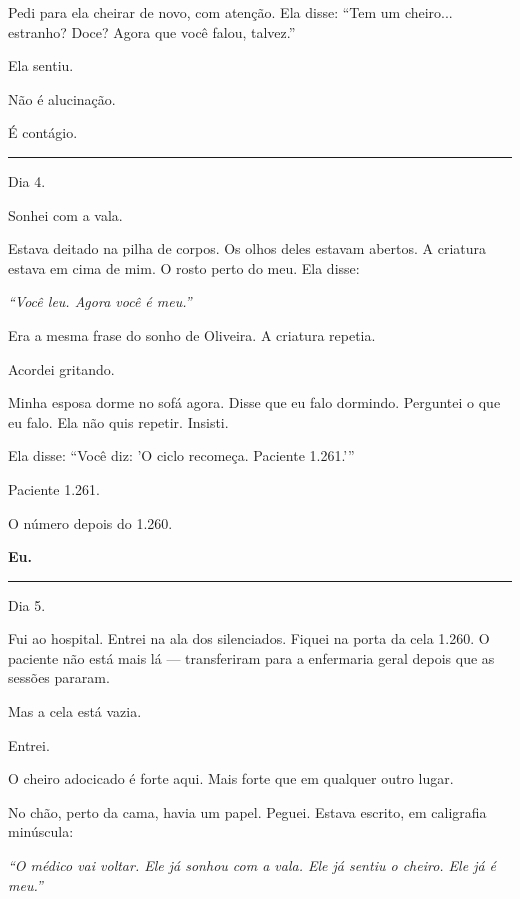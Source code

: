 \noindent Pedi para ela cheirar de novo, com atenção. Ela disse: \textquotedblleft{}Tem um cheiro... estranho? Doce? Agora que você falou, talvez.\textquotedblright{}

\noindent Ela sentiu.

\noindent Não é alucinação.

\noindent É contágio.

\vspace{0.5em}\noindent\rule{\textwidth}{0.5pt}\vspace{0.5em}

\noindent Dia 4.

\noindent Sonhei com a vala.

\noindent Estava deitado na pilha de corpos. Os olhos deles estavam abertos. A criatura estava em cima de mim. O rosto perto do meu. Ela disse:

\noindent \textit{\textquotedblleft{}Você leu. Agora você é meu.\textquotedblright{}}

\noindent Era a mesma frase do sonho de Oliveira. A criatura repetia.

\noindent Acordei gritando.

\noindent Minha esposa dorme no sofá agora. Disse que eu falo dormindo. Perguntei o que eu falo. Ela não quis repetir. Insisti.

\noindent Ela disse: \textquotedblleft{}Você diz: 'O ciclo recomeça. Paciente 1.261.'\textquotedblright{}

\noindent Paciente 1.261.

\noindent O número depois do 1.260.

\noindent \textbf{Eu.}

\vspace{0.5em}\noindent\rule{\textwidth}{0.5pt}\vspace{0.5em}

\noindent Dia 5.

\noindent Fui ao hospital. Entrei na ala dos silenciados. Fiquei na porta da cela 1.260. O paciente não está mais lá --- transferiram para a enfermaria geral depois que as sessões pararam.

\noindent Mas a cela está vazia.

\noindent Entrei.

\noindent O cheiro adocicado é forte aqui. Mais forte que em qualquer outro lugar.

\noindent No chão, perto da cama, havia um papel. Peguei. Estava escrito, em caligrafia minúscula:

\noindent \textit{\textquotedblleft{}O médico vai voltar. Ele já sonhou com a vala. Ele já sentiu o cheiro. Ele já é meu.\textquotedblright{}}

